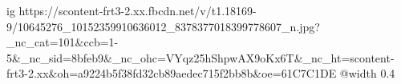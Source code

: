  
 
 
 
 

\ifcmt
  ig https://scontent-frt3-2.xx.fbcdn.net/v/t1.18169-9/10645276_10152359910636012_8378377018399778607_n.jpg?_nc_cat=101&ccb=1-5&_nc_sid=8bfeb9&_nc_ohc=VYqz25hShpwAX9oKx6T&_nc_ht=scontent-frt3-2.xx&oh=a9224b5f38fd32cb89aedec715f2bb8b&oe=61C7C1DE
  @width 0.4
\fi

